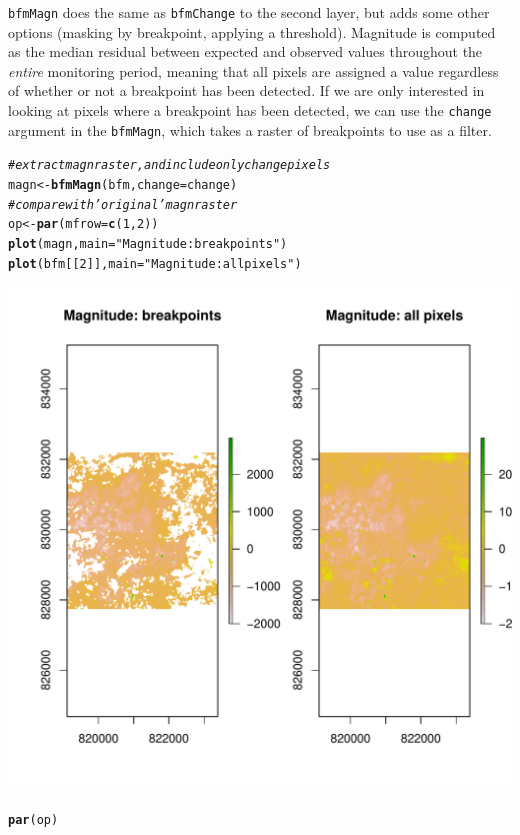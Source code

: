 \documentclass{article}\usepackage[]{graphicx}\usepackage[]{color}
\makeatletter
\def\maxwidth{ %
  \ifdim\Gin@nat@width>\linewidth
    \linewidth
  \else
    \Gin@nat@width
  \fi
}
\newcommand{\hlnum}[1]{\textcolor[rgb]{0.686,0.059,0.569}{#1}}%
\newcommand{\hlstr}[1]{\textcolor[rgb]{0.192,0.494,0.8}{#1}}%
\newcommand{\hlcom}[1]{\textcolor[rgb]{0.678,0.584,0.686}{\textit{#1}}}%
\newcommand{\hlstd}[1]{\textcolor[rgb]{0.345,0.345,0.345}{#1}}%
\newcommand{\hlkwb}[1]{\textcolor[rgb]{0.69,0.353,0.396}{#1}}%
\newcommand{\hlkwc}[1]{\textcolor[rgb]{0.333,0.667,0.333}{#1}}%
\newcommand{\hlkwd}[1]{\textcolor[rgb]{0.737,0.353,0.396}{\textbf{#1}}}%
\newenvironment{kframe}{%
 \def\at@end@of@kframe{}%
 \ifinner\ifhmode%
  \def\at@end@of@kframe{\end{minipage}}%
  \begin{minipage}{\columnwidth}%
 \fi\fi%
 \def\FrameCommand##1{\hskip\@totalleftmargin \hskip-\fboxsep
 \colorbox{shadecolor}{##1}\hskip-\fboxsep
     \hskip-\linewidth \hskip-\@totalleftmargin \hskip\columnwidth}%
 \MakeFramed {\advance\hsize-\width
   \@totalleftmargin\z@ \linewidth\hsize
   \@setminipage}}%
 {\par\unskip\endMakeFramed%
 \at@end@of@kframe}
\newenvironment{knitrout}{}{} %
\def\code#1{\texttt{#1}}
\makeatother
\begin{document}
\code{bfmMagn} does the same as \code{bfmChange} to the second layer, but adds some other options (masking by breakpoint, applying a threshold). Magnitude is computed as the median residual between expected and observed values throughout the \emph{entire} monitoring period, meaning that all pixels are assigned a value regardless of whether or not a breakpoint has been detected. If we are only interested in looking at pixels where a breakpoint has been detected, we can use the \code{change} argument in the \code{bfmMagn}, which takes a raster of breakpoints to use as a filter.

\begin{knitrout}
\color{fgcolor}\begin{kframe}
\begin{alltt}
\hlcom{# extract magn raster, and include only change pixels}
\hlstd{magn} \hlkwb{<-} \hlkwd{bfmMagn}\hlstd{(bfm,} \hlkwc{change} \hlstd{= change)}
\hlcom{# compare with 'original' magn raster}
\hlstd{op} \hlkwb{<-} \hlkwd{par}\hlstd{(}\hlkwc{mfrow} \hlstd{=} \hlkwd{c}\hlstd{(}\hlnum{1}\hlstd{,} \hlnum{2}\hlstd{))}
\hlkwd{plot}\hlstd{(magn,} \hlkwc{main} \hlstd{=} \hlstr{"Magnitude: breakpoints"}\hlstd{)}
\hlkwd{plot}\hlstd{(bfm[[}\hlnum{2}\hlstd{]],} \hlkwc{main} \hlstd{=} \hlstr{"Magnitude: all pixels"}\hlstd{)}
\end{alltt}
\end{kframe}
\includegraphics[width=\maxwidth]{figure/bfmMagn} 
\begin{kframe}\begin{alltt}
\hlkwd{par}\hlstd{(op)}
\end{alltt}
\end{kframe}
\end{knitrout}
\end{document}
